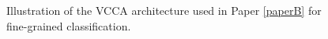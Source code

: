 

\begin{figure}[t]
	\centering
	\resizebox{0.95\textwidth}{!}{
		
	}
	\caption{Illustration of the VCCA architecture used in Paper \ref{paperB} for fine-grained classification. }
	\vspace{-3mm}
	\label{fig:vcca_architecture}
\end{figure}




